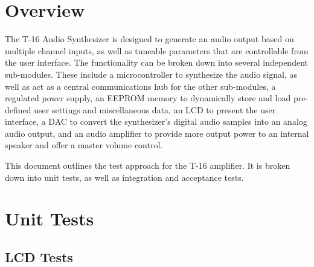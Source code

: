 \documentclass{article}
\begin{document}
\newpage

\section{Overview}

The T-16 Audio Synthesizer is designed to generate an audio output based on multiple channel inputs, as well as tuneable parameters that are controllable from the user interface.  The functionality can be broken down into several independent sub-modules.  These include a microcontroller to synthesize the audio signal, as well as act as a central communications hub for the other sub-modules, a regulated power supply, an EEPROM memory to dynamically store and load pre-defined user settings and miscellaneous data, an LCD to present the user interface, a DAC to convert the synthesizer's digital audio samples into an analog audio output, and an audio amplifier to provide more output power to an internal speaker and offer a master volume control. 


This document outlines the test approach for the T-16 amplifier. It is
broken down into unit tests, as well as integration and acceptance
tests.

\section{Unit Tests}
\subsection{LCD Tests}
\end{document}
